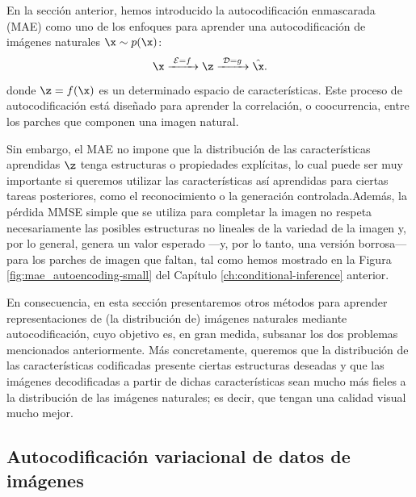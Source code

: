 \documentclass[../../book-main_es.tex]{subfiles}
\begin{document}
En la sección anterior, hemos introducido la autocodificación enmascarada (MAE) como uno de los enfoques 
para aprender una autocodificación de imágenes naturales $\x \sim p(\x)$:
\begin{equation}
\x\xrightarrow{\hspace{1mm} \mathcal{E} = f \hspace{1mm}} \z
\xrightarrow{\hspace{1mm} \mathcal{D} = g \hspace{1mm}} \hat{\x}.
\end{equation}
donde $\z = f(\x)$ es un determinado espacio de características. Este proceso de autocodificación está diseñado 
para aprender la correlación, o coocurrencia, entre los parches que componen una imagen natural.

Sin embargo, el MAE no impone que la distribución de las características aprendidas $\z$ tenga 
estructuras o propiedades explícitas, lo cual puede ser muy importante si queremos utilizar las 
características así aprendidas para ciertas tareas posteriores, como el reconocimiento o la 
generación controlada.Además, la pérdida MMSE simple que se utiliza para completar la imagen no 
respeta necesariamente las posibles estructuras no lineales de la variedad de la imagen y, por 
lo general, genera un valor esperado ---y, por lo tanto, una versión borrosa--- para los parches 
de imagen que faltan, tal como hemos mostrado en la Figura \ref{fig:mae_autoencoding-small} del 
Capítulo \ref{ch:conditional-inference} anterior.

En consecuencia, en esta sección presentaremos otros métodos para aprender representaciones de (la 
distribución de) imágenes naturales mediante autocodificación, cuyo objetivo es, en gran medida, 
subsanar los dos problemas mencionados anteriormente. Más concretamente, queremos que la 
distribución de las características codificadas presente ciertas estructuras deseadas y que las 
imágenes decodificadas a partir de dichas características sean mucho más fieles a la distribución 
de las imágenes naturales; es decir, que tengan una calidad visual mucho mejor.


\subsection{Autocodificación variacional de datos de imágenes}
\end{document}
